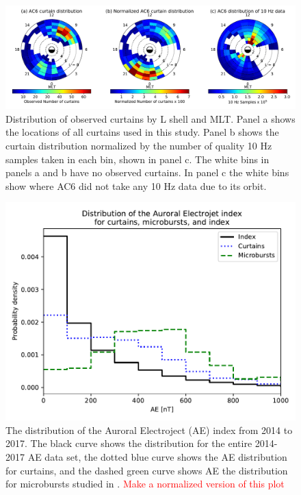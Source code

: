 \documentclass[draft]{agujournal2019}
\begin{document}
\begin{figure}
\includegraphics[width=\textwidth]{fig2_2.pdf}
\caption{Distribution of observed curtains by L shell and MLT. Panel a shows the locations of all curtains used in this study. Panel b shows the curtain distribution normalized by the number of quality 10 Hz samples taken in each bin, shown in panel c. The white bins in panels a and b have no observed curtains. In panel c the white bins show where AC6 did not take any 10 Hz data due to its orbit.}
\label{l_mlt_dist}
\end{figure}

\begin{figure}
\includegraphics[width=\textwidth]{ac6_curtain_microburst_AE_dist.pdf}
\caption{The distribution of the Auroral Electroject (AE) index from 2014 to 2017. The black curve shows the distribution for the entire 2014-2017 AE data set, the dotted blue curve shows the AE distribution for curtains, and the dashed green curve shows AE the distribution for microbursts studied in . \textcolor{red}{Make a normalized version of this plot}}
\label{ae_dist}
\end{figure}
\end{document}
